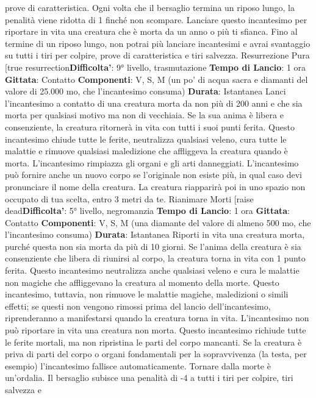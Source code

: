 \begin{multicols}{2}
prove di caratteristica. Ogni volta che il bersaglio
termina un riposo lungo, la penalità viene ridotta di 1
finché non scompare.
Lanciare questo incantesimo per riportare in vita una
creatura che è morta da un anno o più ti sfianca. Fino al
termine di un riposo lungo, non potrai più lanciare
incantesimi e avrai svantaggio su tutti i tiri per colpire,
prove di caratteristica e tiri salvezza.
Resurrezione Pura
[true resurrection\textbf{Difficolta'}:
9° livello, trasmutazione
\textbf{Tempo di Lancio}: 1 ora
\textbf{Gittata}: Contatto
\textbf{Componenti}: V, S, M (un po’ di acqua sacra e diamanti
del valore di 25.000 mo, che l’incantesimo consuma)
\textbf{Durata}: Istantanea
Lanci l’incantesimo a contatto di una creatura morta da
non più di 200 anni e che sia morta per qualsiasi motivo
ma non di vecchiaia. Se la sua anima è libera e
consenziente, la creatura ritornerà in vita con tutti i suoi
punti ferita.
Questo incantesimo chiude tutte le ferite, neutralizza
qualsiasi veleno, cura tutte le malattie e rimuove
qualsiasi maledizione che affliggeva la creatura quando
è morta. L’incantesimo rimpiazza gli organi e gli arti
danneggiati.
L’incantesimo può fornire anche un nuovo corpo se
l’originale non esiste più, in qual caso devi pronunciare
il nome della creatura. La creatura riapparirà poi in uno
spazio non occupato di tua scelta, entro 3 metri da te.
Rianimare Morti
[raise dead\textbf{Difficolta'}:
5° livello, negromanzia
\textbf{Tempo di Lancio}: 1 ora
\textbf{Gittata}: Contatto
\textbf{Componenti}: V, S, M (una diamante del valore di
almeno 500 mo, che l’incantesimo consuma)
\textbf{Durata}: Istantanea
Riporti in vita una creatura morta, purché questa non
sia morta da più di 10 giorni. Se l’anima della creatura è
sia consenziente che libera di riunirsi al corpo, la
creatura torna in vita con 1 punto ferita.
Questo incantesimo neutralizza anche qualsiasi veleno
e cura le malattie non magiche che affliggevano la
creatura al momento della morte. Questo incantesimo,
tuttavia, non rimuove le malattie magiche, maledizioni o
simili effetti; se questi non vengono rimossi prima del
lancio dell’incantesimo, riprenderanno a manifestarsi
quando la creatura torna in vita. L’incantesimo non può
riportare in vita una creatura non morta.
Questo incantesimo richiude tutte le ferite mortali, ma
non ripristina le parti del corpo mancanti. Se la creatura
è priva di parti del corpo o organi fondamentali per la
sopravvivenza (la testa, per esempio) l’incantesimo
fallisce automaticamente.
Tornare dalla morte è un’ordalia. Il bersaglio subisce
una penalità di -4 a tutti i tiri per colpire, tiri salvezza e

\end{multicols}
